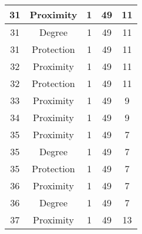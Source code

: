 \documentclass[results.tex]{subfiles}
\begin{document}
\begin{center}
\begin{tabular}{| c || c | c | c | c |}
            \hline
            31                      & Proximity                    & 1                      & 49                      & 11                   \\
            \hline
            31                      & Degree                       & 1                      & 49                      & 11                   \\
            \hline
            31                      & Protection                   & 1                      & 49                      & 11                   \\
            \hline
            32                      & Proximity                    & 1                      & 49                      & 11                   \\
            \hline
            32                      & Protection                   & 1                      & 49                      & 11                   \\
            \hline
            33                      & Proximity                    & 1                      & 49                      & 9                    \\
            \hline
            34                      & Proximity                    & 1                      & 49                      & 9                    \\
            \hline
            35                      & Proximity                    & 1                      & 49                      & 7                    \\
            \hline
            35                      & Degree                       & 1                      & 49                      & 7                    \\
            \hline
            35                      & Protection                   & 1                      & 49                      & 7                    \\
            \hline
            36                      & Proximity                    & 1                      & 49                      & 7                    \\
            \hline
            36                      & Degree                       & 1                      & 49                      & 7                    \\
            \hline
            37                      & Proximity                    & 1                      & 49                      & 13                   \\

\end{tabular}
\end{center}
\end{document}
